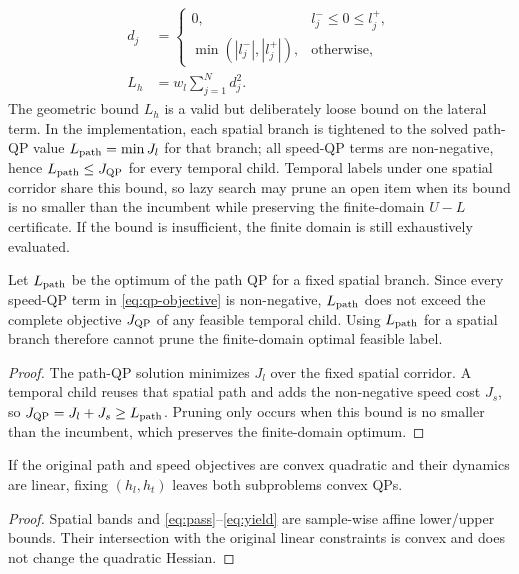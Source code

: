 \begin{equation}
\begin{aligned}
d_j&=\begin{cases}0,&l_j^-\leq0\leq l_j^+,\\
\min(|l_j^-|,|l_j^+|),&\text{otherwise,}\end{cases}
\\
L_h&=w_l\sum_{j=1}^{N}d_j^2 .
\end{aligned}
\label{eq:corridor-lb}
\end{equation}
The geometric bound $L_h$ is a valid but deliberately loose bound on the lateral term. In the implementation, each spatial branch is tightened to the solved path-QP value $L_{\rm path}=\min J_l$ for that branch; all speed-QP terms are non-negative, hence $L_{\rm path}\leq J_{\rm QP}$ for every temporal child. Temporal labels under one spatial corridor share this bound, so lazy search may prune an open item when its bound is no smaller than the incumbent while preserving the finite-domain $U-L$ certificate. If the bound is insufficient, the finite domain is still exhaustively evaluated.

\begin{proposition}
Let $L_{\rm path}$ be the optimum of the path QP for a fixed spatial branch. Since every speed-QP term in \eqref{eq:qp-objective} is non-negative, $L_{\rm path}$ does not exceed the complete objective $J_{\rm QP}$ of any feasible temporal child. Using $L_{\rm path}$ for a spatial branch therefore cannot prune the finite-domain optimal feasible label.
\end{proposition}
\begin{proof}
The path-QP solution minimizes $J_l$ over the fixed spatial corridor. A temporal child reuses that spatial path and adds the non-negative speed cost $J_s$, so $J_{\rm QP}=J_l+J_s\geq L_{\rm path}$. Pruning only occurs when this bound is no smaller than the incumbent, which preserves the finite-domain optimum.
\end{proof}

\begin{proposition}
If the original path and speed objectives are convex quadratic and their dynamics are linear, fixing $(h_l,h_t)$ leaves both subproblems convex QPs.
\end{proposition}
\begin{proof}
Spatial bands and \eqref{eq:pass}--\eqref{eq:yield} are sample-wise affine lower/upper bounds. Their intersection with the original linear constraints is convex and does not change the quadratic Hessian.
\end{proof}

